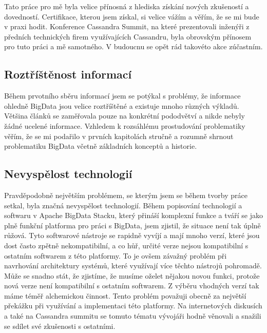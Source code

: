Tato práce pro mě byla velice přínosná z hlediska získání nových zkušeností a dovedností. Certifikace, kterou jsem získal, si velice vážím a věřím, že se mi bude v praxi hodit. Konference Cassandra Summit, na které prezentovali inženýři z předních technických firem využívajících Cassandru, byla obrovským přínosem pro tuto práci a mě samotného. V budoucnu se opět rád takovéto akce zúčastním. 

\subsection{Roztříštěnost informací}
Během prvotního sběru informací jsem se potýkal s problémy, že informace ohledně BigData jsou velice roztříštěné a existuje mnoho různých výkladů. Většina článků se zaměřovala pouze na konkrétní pododvětví a nikde nebyly žádné ucelené informace. Vzhledem k rozsáhlému prostudování problematiky věřím, že se mi podařilo v prvních kapitolách stručně a rozumně shrnout problematiku BigData včetně základních konceptů a historie. 

\subsection{Nevyspělost technologií}
Pravděpodobně největším problémem, se kterým jsem se během tvorby práce setkal, byla značná nevyspělost technologií. Během popisování technologií a softwaru v Apache BigData Stacku, který přináší komplexní funkce a tváří se jako plně funkční platforma pro práci s BigData, jsem zjistil, že situace není tak úplně růžová. Tyto softwarové nástroje se rapidně vyvíjí a mají mnoho verzí, které jsou dost často zpětně nekompatibilní, a co hůř, určité verze nejsou kompatibilní s ostatním softwarem z této platformy. To je ovšem závažný problém při navrhování architektury systémů, které využívají více těchto nástrojů pohromadě. Může se snadno stát, že zjistíme, že musíme oželet nějakou novou funkci, protože nová verze není kompatibilní s ostatním softwarem. Z výběru vhodných verzí tak máme téměř alchemickou činnost. Tento problém považuji obecně za největší překážku při využívání a implementaci této platformy. Na internetových diskusích a také na Cassandra summitu se tomuto tématu vývojáři hodně věnovali a snažili se sdílet své zkušenosti s ostatními.  

